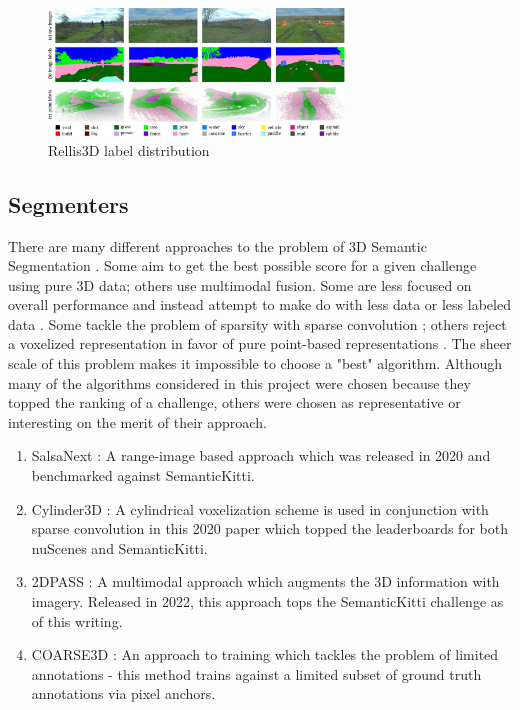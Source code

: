 \begin{figure}[htp]
  \centering
  \includegraphics[width=0.7\textwidth]{images/rellis_label_suite.png}
  \caption{Rellis3D label distribution}
  \label{fig:rellis-labe-suite}
\end{figure}

\subsection{Segmenters}
\label{sec:segmenters}

There are many different approaches to the problem of 3D Semantic Segmentation \cite{deeplearningpcsurvey}. Some aim to get the best possible score for a given challenge using pure 3D data; others use multimodal fusion. Some are less focused on overall performance and instead attempt to make do with less data or less labeled data \cite{2dpass}. Some tackle the problem of sparsity with sparse convolution \cite{sparseconv}; others reject a voxelized representation in favor of pure point-based representations \cite{pointnet}. The sheer scale of this problem makes it impossible to choose a "best" algorithm. Although many of the algorithms considered in this project were chosen because they topped the ranking of a challenge, others were chosen as representative or interesting on the merit of their approach.

\begin{enumerate}
  \item SalsaNext \cite{salsanext}: A range-image based approach which was released in 2020 and benchmarked against SemanticKitti.
  \item Cylinder3D \cite{cylinder3d}: A cylindrical voxelization scheme is used in conjunction with sparse convolution in this 2020 paper which topped the leaderboards for both nuScenes and SemanticKitti.
  \item 2DPASS \cite{2dpass}: A multimodal approach which augments the 3D information with imagery. Released in 2022, this approach tops the SemanticKitti challenge as of this writing.
  \item COARSE3D \cite{coarse3d}: An approach to training which tackles the problem of limited annotations - this method trains against a limited subset of ground truth annotations via pixel anchors.
\end{enumerate}


